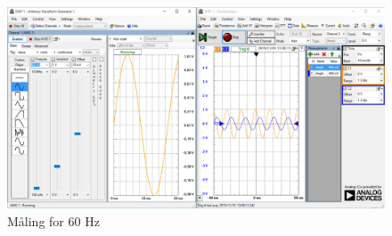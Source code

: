 \begin{figure}[htb]
	\centering
	\includegraphics[width=1.0\textwidth]{Figurer/60Hz}
	\caption{Måling for 60 Hz}
	\label{fig:maeling60Hz}
\end{figure}